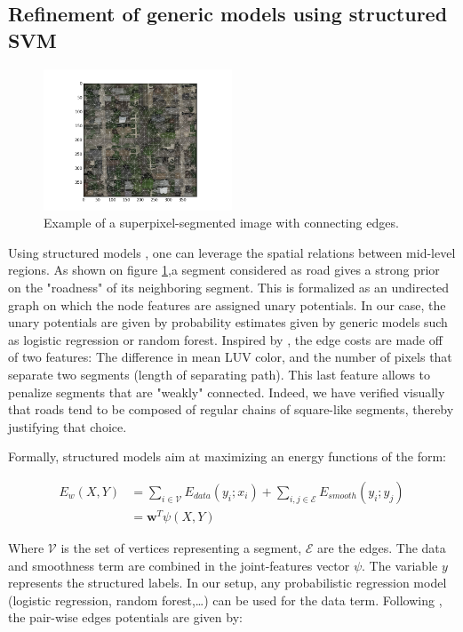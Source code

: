 \documentclass[10pt,conference,compsocconf]{IEEEtran}
\begin{document}
\subsection{Refinement of generic models using structured SVM}
\begin{figure}[htb]
\centering
\includegraphics[width=0.5\textwidth]{pics/ex_graph.png}
\caption{\label{fig:graph}
Example of a superpixel-segmented image with connecting edges.}
\end{figure}

   Using structured models \cite{tsochantaridis05}, one can leverage the spatial relations between mid-level regions. As shown on figure \ref{fig:graph},a segment considered as road gives a strong prior on the "roadness" of its neighboring segment. This is formalized as an undirected graph on which the node features are assigned unary potentials. In our case, the unary potentials are given by probability estimates given by generic models such as logistic regression or random forest.
Inspired by \cite{fulkerson09}, the edge costs are made off of two features: The difference in mean LUV color, and the number of pixels that separate two segments (length of separating path). This last feature allows to penalize segments that are "weakly" connected. Indeed, we have verified visually that roads tend to be composed of regular chains of square-like segments, thereby justifying that choice.

Formally, structured models aim at maximizing an energy functions of the form:

 \begin{equation}
 \begin{split}
E_w(X,Y) &= \sum_{i \in \mathcal{V}} E_{data}(y_i;x_i) + \sum_{i,j \in \mathcal{E}} E_{smooth}(y_i;y_j) \\
 &= \mathbf{w}^T \psi(X,Y)
 \end{split}
 \end{equation}

Where \(\mathcal{V}\) is the set of vertices representing a segment, \(\mathcal{E}\) are the edges. The data and smoothness term are combined in the joint-features vector \(\psi\). The variable \(y\) represents the structured labels. In our setup, any probabilistic regression model (logistic regression, random forest,\ldots{}) can be used for the data term. Following \cite{fulkerson09}, the pair-wise edges potentials are given by:
\end{document}
